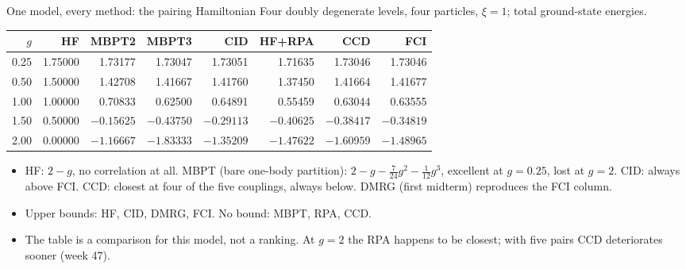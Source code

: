 \documentclass[aspectratio=169,10pt]{beamer}
\begin{document}
\begin{frame}{One model, every method: the pairing Hamiltonian}
\small
Four doubly degenerate levels, four particles, $\xi=1$; total ground-state energies.
\begin{center}
\setlength{\tabcolsep}{5pt}\renewcommand{\arraystretch}{1.15}
\begin{tabular}{@{}rrrrrrrr@{}}
\toprule
$g$ & HF & MBPT2 & MBPT3 & CID & HF+RPA & CCD & FCI\\
\midrule
0.25 & 1.75000 & 1.73177 & 1.73047 & 1.73051 & 1.71635 & 1.73046 & 1.73046\\
0.50 & 1.50000 & 1.42708 & 1.41667 & 1.41760 & 1.37450 & 1.41664 & 1.41677\\
1.00 & 1.00000 & 0.70833 & 0.62500 & 0.64891 & 0.55459 & 0.63044 & 0.63555\\
1.50 & 0.50000 & $-0.15625$ & $-0.43750$ & $-0.29113$ & $-0.40625$ & $-0.38417$ & $-0.34819$\\
2.00 & 0.00000 & $-1.16667$ & $-1.83333$ & $-1.35209$ & $-1.47622$ & $-1.60959$ & $-1.48965$\\
\bottomrule
\end{tabular}
\end{center}
\begin{itemize}
\item HF: $2-g$, no correlation at all. MBPT (bare one-body partition): $2-g-\tfrac7{24}g^2-\tfrac1{12}g^3$, excellent at $g=0.25$, lost at $g=2$. CID: always above FCI. CCD: closest at four of the five couplings, always below. DMRG (first midterm) reproduces the FCI column.
\item Upper bounds: HF, CID, DMRG, FCI. No bound: MBPT, RPA, CCD.
\item The table is a comparison for this model, not a ranking. At $g=2$ the RPA happens to be closest; with five pairs CCD deteriorates sooner (week 47).
\end{itemize}
\end{frame}
\end{document}
